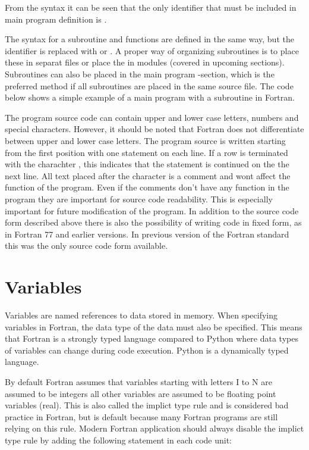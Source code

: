 From the syntax it can be seen that the only identifier that must be included in main program definition is .

The syntax for a subroutine and functions are defined in the same way, but the  identifier is replaced with  or . A proper way of organizing subroutines is to place these in separat files or place the in modules (covered in upcoming sections). Subroutines can also be placed in the main program -section, which is the preferred method if all subroutines are placed in the same source file. The code below shows a simple example of a main program with a subroutine in Fortran.


The program source code can contain upper and lower case letters, numbers and special characters. However, it should be noted that Fortran does not differentiate between upper and lower case letters. The program source is written starting from the first position with one statement on each line. If a row is terminated with the charachter \foper{\&}, this indicates that the statement is continued on the the next line. All text placed after the character \foper{!} is a comment and wont affect the function of the program. Even if the comments don't have any function in the program they are important for source code readability. This is especially important for future modification of the program. In addition to the source code
form described above there is also the possibility of writing code in fixed form, as in Fortran 77 and earlier versions. In previous version of the Fortran standard this was the only source code form available.

\section{Variables}

Variables are named references to data stored in memory. When specifying variables in Fortran, the data type of the data must also be specified. This means that Fortran is a strongly typed language compared to Python where data types of variables can change during code execution. Python is a dynamically typed language.

By default Fortran assumes that variables starting with letters I to N are assumed to be integers all other variables are assumed to be floating point variables (real). This is also called the implict type rule and is considered bad practice in Fortran, but is default because many Fortran programs are still relying on this rule. Modern Fortran application should always disable the implict type rule by adding the following statement in each code unit:

